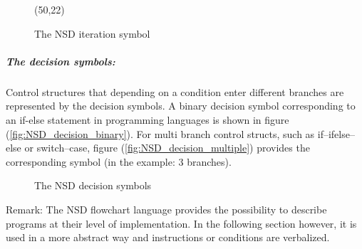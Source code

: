 \documentclass{report}
\begin{document}
\begin{figure}[H]
\centering
\label{NSD_whileLoop}
\begin{struktogramm}(50,22)
\whileend
\end{struktogramm}

\caption{The NSD iteration symbol}
\end{figure}

\subparagraph{The decision symbols:}
Control structures that depending on a condition enter different branches are represented by the decision symbols. A binary decision symbol corresponding to an if-else statement in programming languages is shown in figure (\ref{fig:NSD_decision_binary}). For multi branch control structs, such as if--ifelse--else or switch--case, figure (\ref{fig:NSD_decision_multiple}) provides the corresponding symbol (in the example: 3 branches).
 
\begin{figure}[H]
\centering
{}
\caption{The NSD decision symbols }
\end{figure}




Remark: The NSD flowchart language provides the possibility to describe programs at their level of implementation. In the following section however, it is used in a more abstract way and instructions or conditions are verbalized. 
 
\end{document}
